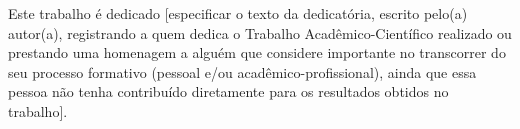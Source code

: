 \vspace*{\fill}

\hspace{\fill}
\begin{minipage}{12cm}
    \setlength{\parindent}{1.25cm}
    
    Este trabalho é dedicado [especificar o texto da dedicatória, escrito pelo(a) autor(a), registrando a quem dedica o Trabalho Acadêmico-Científico realizado ou prestando uma homenagem a alguém que considere importante no transcorrer do seu processo formativo (pessoal e/ou acadêmico-profissional), ainda que essa pessoa não tenha contribuído diretamente para os resultados obtidos no trabalho].
\end{minipage}

\OnesideTwoside{\clearpage}{\cleardoublepage}
